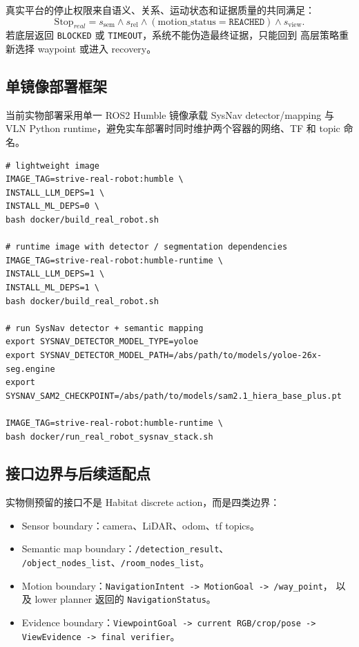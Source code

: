 \documentclass[UTF8,zihao=-4]{ctexart}
\begin{document}
真实平台的停止权限来自语义、关系、运动状态和证据质量的共同满足：
\begin{equation}
  \mathrm{Stop}_{real}
  =
  s_{\mathrm{sem}}
  \land
  s_{\mathrm{rel}}
  \land
  (\mathrm{motion\_status}=\texttt{REACHED})
  \land
  s_{\mathrm{view}} .
\end{equation}
若底层返回 \texttt{BLOCKED} 或 \texttt{TIMEOUT}，系统不能伪造最终证据，只能回到
高层策略重新选择 waypoint 或进入 recovery。

\subsection{单镜像部署框架}

当前实物部署采用单一 ROS2 Humble 镜像承载 SysNav detector/mapping 与 VLN
Python runtime，避免实车部署时同时维护两个容器的网络、TF 和 topic 命名。

\begin{lstlisting}[style=pseudo,caption={Real-robot 镜像构建与运行}]
# lightweight image
IMAGE_TAG=strive-real-robot:humble \
INSTALL_LLM_DEPS=1 \
INSTALL_ML_DEPS=0 \
bash docker/build_real_robot.sh

# runtime image with detector / segmentation dependencies
IMAGE_TAG=strive-real-robot:humble-runtime \
INSTALL_LLM_DEPS=1 \
INSTALL_ML_DEPS=1 \
bash docker/build_real_robot.sh

# run SysNav detector + semantic mapping
export SYSNAV_DETECTOR_MODEL_TYPE=yoloe
export SYSNAV_DETECTOR_MODEL_PATH=/abs/path/to/models/yoloe-26x-seg.engine
export SYSNAV_SAM2_CHECKPOINT=/abs/path/to/models/sam2.1_hiera_base_plus.pt

IMAGE_TAG=strive-real-robot:humble-runtime \
bash docker/run_real_robot_sysnav_stack.sh
\end{lstlisting}

\subsection{接口边界与后续适配点}

实物侧预留的接口不是 Habitat discrete action，而是四类边界：
\begin{itemize}[leftmargin=1.5em]
  \item Sensor boundary：camera、LiDAR、odom、tf topics。
  \item Semantic map boundary：\texttt{/detection\_result}、
  \texttt{/object\_nodes\_list}、\texttt{/room\_nodes\_list}。
  \item Motion boundary：\texttt{NavigationIntent -> MotionGoal -> /way\_point}，
  以及 lower planner 返回的 \texttt{NavigationStatus}。
  \item Evidence boundary：\texttt{ViewpointGoal -> current RGB/crop/pose ->
  ViewEvidence -> final verifier}。
\end{itemize}
\end{document}
